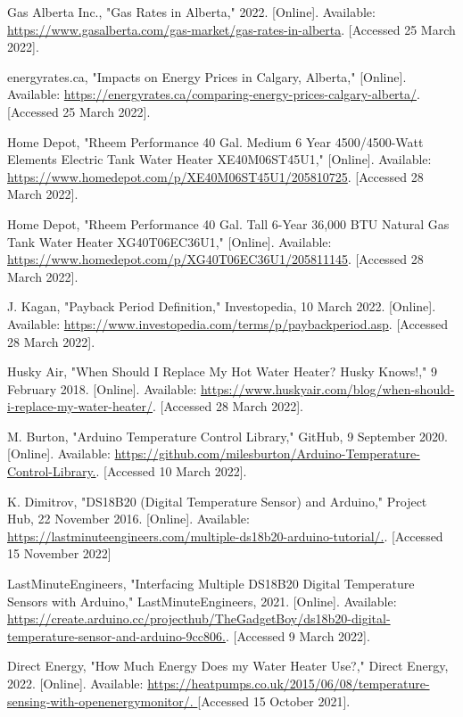 \documentclass{ucalgarythesis}
\begin{document}
\begin{thebibliography}{9}
     Gas Alberta Inc., "Gas Rates in Alberta," 2022. [Online]. Available: \url{https://www.gasalberta.com/gas-market/gas-rates-in-alberta}. [Accessed 25 March 2022].

     energyrates.ca, "Impacts on Energy Prices in Calgary, Alberta," [Online]. Available: \url{https://energyrates.ca/comparing-energy-prices-calgary-alberta/}. [Accessed 25 March 2022].
    
     Home Depot, "Rheem Performance 40 Gal. Medium 6 Year 4500/4500-Watt Elements Electric Tank Water Heater XE40M06ST45U1," [Online]. Available: \url{https://www.homedepot.com/p/XE40M06ST45U1/205810725}. [Accessed 28 March 2022].
    
     Home Depot, "Rheem Performance 40 Gal. Tall 6-Year 36,000 BTU Natural Gas Tank Water Heater XG40T06EC36U1," [Online]. Available: \url{https://www.homedepot.com/p/XG40T06EC36U1/205811145}. [Accessed 28 March 2022].
    
     J. Kagan, "Payback Period Definition," Investopedia, 10 March 2022. [Online]. Available: \url{https://www.investopedia.com/terms/p/paybackperiod.asp}. [Accessed 28 March 2022].
    
     Husky Air, "When Should I Replace My Hot Water Heater? Husky Knows!," 9 February 2018. [Online]. Available: \url{https://www.huskyair.com/blog/when-should-i-replace-my-water-heater/}. [Accessed 28 March 2022].
    
     M. Burton, "Arduino Temperature Control Library," GitHub, 9 September 2020. [Online]. Available:  \url{https://github.com/milesburton/Arduino-Temperature-Control-Library.}. [Accessed 10 March 2022].
    
     K. Dimitrov, "DS18B20 (Digital Temperature Sensor) and Arduino," Project Hub, 22 November 2016. [Online]. Available:  \url{https://lastminuteengineers.com/multiple-ds18b20-arduino-tutorial/.}. [Accessed 15 November 2022]
    
     LastMinuteEngineers, "Interfacing Multiple DS18B20 Digital Temperature Sensors with Arduino," LastMinuteEngineers, 2021. [Online]. Available:  \url{https://create.arduino.cc/projecthub/TheGadgetBoy/ds18b20-digital-temperature-sensor-and-arduino-9cc806.}. [Accessed 9 March 2022].
    
     Direct Energy, "How Much Energy Does my Water Heater Use?," Direct Energy, 2022. [Online]. Available:   \url{https://heatpumps.co.uk/2015/06/08/temperature-sensing-with-openenergymonitor/. } [Accessed 15 October 2021].
    

\end{thebibliography}
\end{document}
